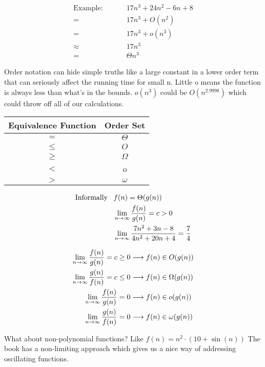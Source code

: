 \documentclass[english, 10pt]{article}
\begin{document}
\begin{align*}
    \text{Example:} \;\;\;\;\;\;\;\;\;
    &17n^3 +24n^2 -6n +8 \\ %
    =& 17n^3 + O(n^2) \\
    =& 17n^3 + o(n^3) \\
    \approx& 17n^3 \\
    =& \Theta{n^3}
\end{align*}

Order notation can hide simple truths like a large constant in a lower order
term that can seriously affect the running time for small n.  Little o means
the function is always less than what's in the bounds. $o(n^3)$ could be
$O(n^{2.9998})$ which could throw off all of our calculations.

\begin{center}
\begin{tabular}{cc}
    Equivalence Function & Order Set\\ \toprule
    $=$ & $\Theta$ \\ \midrule
    $\le$ & $O$ \\ \midrule
    $\ge$ & $\Omega$ \\ \midrule
    $<$ & o \\ \midrule
    $>$ & $\omega$ \\
\end{tabular}
\end{center}


\begin{align*}
    \text{Informally}\;\;\; & f(n) = \Theta(g(n))  \\
    & \lim_{n\rightarrow \infty}\frac{f(n)}{g(n)}= c > 0 \\
    & \lim_{n \rightarrow \infty}\frac{7n^2 +3n -8}{4n^2 +20n +4}=\frac{7}{4}
\end{align*}


\begin{align*}
    \lim_{n \rightarrow \infty} \frac{f(n)}{g(n)} = c \ge 0\longrightarrow   f(n) &\in O(g(n))     \\
    \lim_{n \rightarrow \infty} \frac{g(n)}{f(n)} = c \le 0\longrightarrow   f(n) &\in \Omega(g(n))\\
    \lim_{n \rightarrow \infty} \frac{f(n)}{g(n)} =0       \longrightarrow   f(n) &\in o(g(n))     \\
    \lim_{n \rightarrow \infty} \frac{g(n)}{f(n)} =0       \longrightarrow   f(n) &\in \omega(g(n))\\
\end{align*}

What about non-polynomial functions? Like $f(n) = n^2 \cdot(10+\sin (n))$ The
book has a non-limiting approach which gives us a nice way of addressing
oscillating functions.
\end{document}
